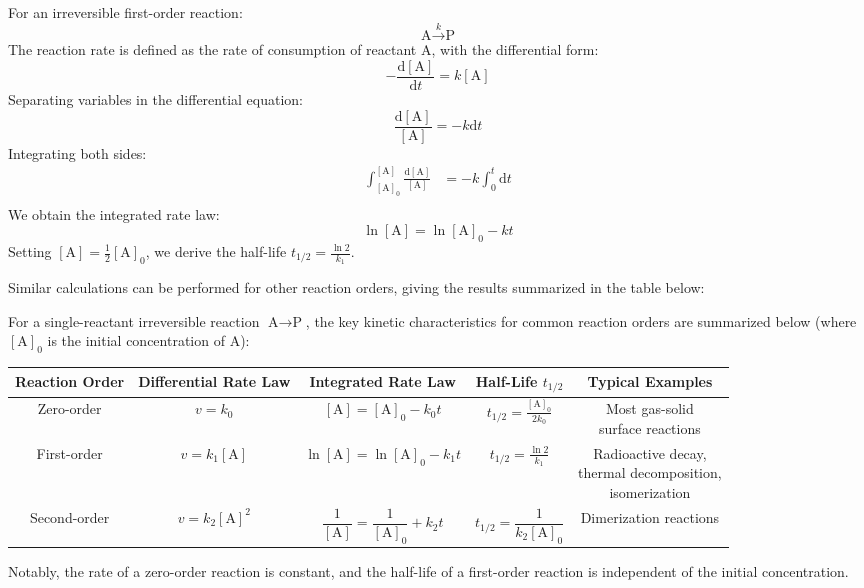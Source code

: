 For an irreversible first-order reaction:
$$\text{A} \xrightarrow{k} \text{P}$$
The reaction rate is defined as the rate of consumption of reactant A, with the differential form:
$$-\frac{\mathrm{d}[\text{A}]}{\mathrm{d}t} = k[\text{A}]$$
Separating variables in the differential equation:
$$\frac{\mathrm{d}[\text{A}]}{[\text{A}]} = -k \mathrm{d}t$$
Integrating both sides:
\begin{align*}
\int_{[\text{A}]_0}^{[\text{A}]} \frac{\mathrm{d}[\text{A}]}{[\text{A}]} &= -k \int_{0}^{t} \mathrm{d}t \\
\end{align*}
We obtain the integrated rate law:
$$\ln[\text{A}] = \ln[\text{A}]_0 - kt$$
Setting $[\text{A}] = \frac{1}{2}[\text{A}]_0$, we derive the half-life $t_{1/2} = \frac{\ln 2}{k_1}$.

Similar calculations can be performed for other reaction orders, giving the results summarized in the table below:

\begin{proposition}
For a single-reactant irreversible reaction $\text{A} \rightarrow \text{P}$, the key kinetic characteristics for common reaction orders are summarized below (where $[\text{A}]_0$ is the initial concentration of A):
   
\begin{center}
\begin{tabular}{ccccc}
    \toprule
    Reaction Order & Differential Rate Law & Integrated Rate Law & Half-Life $t_{1/2}$ & Typical Examples \\
    \midrule
    Zero-order & $v = k_0$ & $[\text{A}] = [\text{A}]_0 - k_0 t$ & $t_{1/2} = \frac{[\text{A}]_0}{2k_0}$ & \makecell[c]{Most gas-solid \\ surface reactions} \\
    First-order & $v = k_1 [\text{A}]$ & $\ln[\text{A}] = \ln[\text{A}]_0 - k_1 t$ & $t_{1/2} = \frac{\ln 2}{k_1}$ & \makecell[c]{Radioactive decay, \\ thermal decomposition, \\ isomerization} \\
    Second-order & $v = k_2 [\text{A}]^2$ & $\dfrac{1}{[\text{A}]} = \dfrac{1}{[\text{A}]_0} + k_2 t$ & $t_{1/2} = \dfrac{1}{k_2 [\text{A}]_0}$ & Dimerization reactions \\
    \bottomrule
\end{tabular}
\end{center}
Notably, the rate of a zero-order reaction is constant, and the half-life of a first-order reaction is independent of the initial concentration.

\end{proposition}

